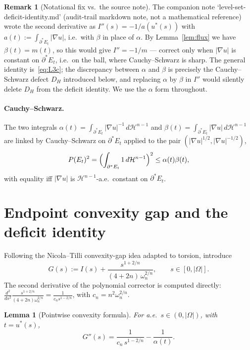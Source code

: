\documentclass[11pt]{article}
\newtheorem{lemma}[theorem]{Lemma}
\theoremstyle{definition}
\newtheorem{remark}[theorem]{Remark}
\newcommand{\Om}{\Omega}
\begin{document}
\begin{remark}[Notational fix vs.\ the source note]\label{rem:fix}
The companion note `level-set-deficit-identity.md' (audit-trail
markdown note, not a mathematical reference) wrote the second
derivative as $I''(s)=-1/a(u^{*}(s))$ with $a(t):=\int_{\partial^{*}E_{t}}
|\nabla u|$, i.e.\ with $\beta$ in place of $\alpha$. By
Lemma~\ref{lem:flux} we have $\beta(t)=m(t)$, so this would give
$I''=-1/m$ --- correct only when $|\nabla u|$ is constant on
$\partial^{*}E_{t}$, i.e.\ on the ball, where Cauchy--Schwarz is sharp.
The general identity is~\eqref{eq:L3c}; the discrepancy between
$\alpha$ and $\beta$ is precisely the Cauchy--Schwarz defect $D_{H}$
introduced below, and replacing $\alpha$ by $\beta$ in $I''$ would
silently delete $D_{H}$ from the deficit identity. We use
the $\alpha$ form throughout.
\end{remark}

\paragraph{Cauchy--Schwarz.} The two integrals
$\alpha(t)=\int_{\partial^{*}E_{t}}|\nabla u|^{-1}\,d\mathcal H^{n-1}$
and $\beta(t)=\int_{\partial^{*}E_{t}}|\nabla u|\,d\mathcal H^{n-1}$ are
linked by Cauchy--Schwarz on $\partial^{*}E_{t}$ applied to the pair
$(|\nabla u|^{1/2},|\nabla u|^{-1/2})$,
\begin{equation}\label{eq:CS}
   P(E_{t})^{2}=\Bigl(\int_{\partial^{*}E_{t}}1\,d\mathcal H^{n-1}\Bigr)^{2}
   \le\alpha(t)\beta(t),
\end{equation}
with equality iff $|\nabla u|$ is $\mathcal H^{n-1}$-a.e.\ constant on
$\partial^{*}E_{t}$.

\section{Endpoint convexity gap and the deficit identity}
\label{sec:main}

Following the Nicola--Tilli convexity-gap idea adapted to torsion,
introduce
\begin{equation}\label{eq:Gdef}
   G(s):=I(s)+\frac{s^{1+2/n}}{(4+2n)\,\omega_{n}^{2/n}},
   \qquad s\in[0,|\Om|].
\end{equation}
The second derivative of the polynomial corrector is computed directly:
$\frac{d^{2}}{ds^{2}}\frac{s^{1+2/n}}{(4+2n)\omega_{n}^{2/n}}
=\frac{1}{c_{n}s^{1-2/n}}$, with $c_{n}=n^{2}\omega_{n}^{2/n}$.

\begin{lemma}[Pointwise convexity formula]\label{lem:Gpp}
For a.e.\ $s\in(0,|\Om|)$, with $t=u^{*}(s)$,
\begin{equation}\label{eq:Gpp}
   G''(s)
   =\frac{1}{c_{n}\,s^{1-2/n}}-\frac{1}{\alpha(t)}.
\end{equation}
\end{lemma}
\end{document}
